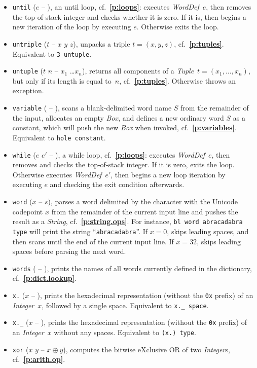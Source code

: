 \documentclass[12pt,oneside]{article}
\def\refpoint#1{{\rm\textbf{\ref{#1}}}}
\let\ptref=\refpoint
\begin{document}
\begin{itemize}
\item {\tt until} ($e$ -- ), an until loop, cf.~\ptref{p:loops}: executes {\em WordDef\/}~$e$, then removes the top-of-stack integer and checks whether it is zero. If it is, then begins a new iteration of the loop by executing $e$. Otherwise exits the loop.
\item {\tt untriple} ($t$ -- $x$ $y$ $z$), unpacks a triple $t=(x,y,z)$, cf.~\ptref{p:tuples}. Equivalent to {\tt 3 untuple}.
\item {\tt untuple} ($t$ $n$ -- $x_1$ \dots $x_n$), returns all components of a {\em Tuple\/}~$t=(x_1,\ldots,x_n)$, but only if its length is equal to~$n$, cf.~\ptref{p:tuples}. Otherwise throws an exception.
\item {\tt variable} ( -- ), scans a blank-delimited word name $S$ from the remainder of the input, allocates an empty {\em Box}, and defines a new ordinary word $S$ as a constant, which will push the new {\em Box\/} when invoked, cf.~\ptref{p:variables}. Equivalent to {\tt hole constant}.
\item {\tt while} ($e$ $e'$ -- ), a while loop, cf.~\ptref{p:loops}: executes {\em WordDef\/}~$e$, then removes and checks the top-of-stack integer. If it is zero, exits the loop. Otherwise executes {\em WordDef\/}~$e'$, then begins a new loop iteration by executing $e$ and checking the exit condition afterwards.
\item {\tt word} ($x$ -- $s$), parses a word delimited by the character with the Unicode codepoint $x$ from the remainder of the current input line and pushes the result as a {\em String}, cf.~\ptref{p:string.ops}. For instance, {\tt bl word abracadabra type} will print the string ``{\tt abracadabra}''. If $x=0$, skips leading spaces, and then scans until the end of the current input line. If $x=32$, skips leading spaces before parsing the next word.
\item {\tt words} ( -- ), prints the names of all words currently defined in the dictionary, cf.~\ptref{p:dict.lookup}.
\item {\tt x.} ($x$ -- ), prints the hexadecimal representation (without the {\tt 0x} prefix) of an {\em Integer\/}~$x$, followed by a single space. Equivalent to {\tt x.\_ space}.
\item {\tt x.\_} ($x$ -- ), prints the hexadecimal representation (without the {\tt 0x} prefix) of an {\em Integer\/}~$x$ without any spaces. Equivalent to {\tt (x.)~type}.
\item {\tt xor} ($x$ $y$ -- $x\oplus y$), computes the bitwise eXclusive OR of two {\em Integer\/}s, cf.~\ptref{p:arith.op}.

\end{itemize}
\end{document}
